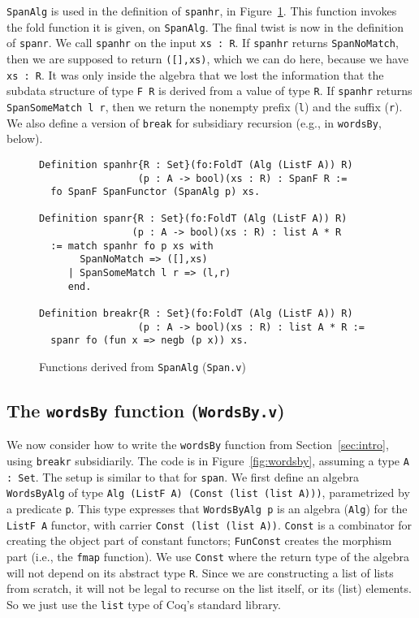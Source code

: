 \documentclass[a4paper,USenglish]{lipics-v2021}
\begin{document}
\verb|SpanAlg| is used in the definition of \verb|spanhr|, in
Figure~\ref{fig:span}.  This function invokes the fold function it is
given, on \verb|SpanAlg|.  The final twist is now in the definition of
\verb|spanr|.  We call \verb|spanhr| on the input \verb|xs : R|.  If
\verb|spanhr| returns \verb|SpanNoMatch|, then we are supposed to
return \verb|([],xs)|, which we can do here, because we have
\verb|xs : R|.  It was only inside the algebra that we lost the
information that the subdata structure of type \verb|F R| is derived
from a value of type \verb|R|.  If \verb|spanhr| returns
\verb|SpanSomeMatch l r|, then we return the nonempty
prefix (\verb|l|) and the suffix (\verb|r|).  We also define a version of \verb|break| 
for subsidiary recursion (e.g., in \verb|wordsBy|, below).


\begin{figure}
\begin{verbatim}
Definition spanhr{R : Set}(fo:FoldT (Alg (ListF A)) R)
                 (p : A -> bool)(xs : R) : SpanF R :=
  fo SpanF SpanFunctor (SpanAlg p) xs.

Definition spanr{R : Set}(fo:FoldT (Alg (ListF A)) R)
                (p : A -> bool)(xs : R) : list A * R
  := match spanhr fo p xs with
       SpanNoMatch => ([],xs)
     | SpanSomeMatch l r => (l,r)
     end.

Definition breakr{R : Set}(fo:FoldT (Alg (ListF A)) R)
                 (p : A -> bool)(xs : R) : list A * R :=
  spanr fo (fun x => negb (p x)) xs.
\end{verbatim}
\caption{Functions derived from \texttt{SpanAlg} (\texttt{Span.v})}
\label{fig:span}
\end{figure}


\subsection{The \texttt{wordsBy} function (\texttt{WordsBy.v})}

We now consider how to write the \verb|wordsBy| function from
Section~\ref{sec:intro}, using \verb|breakr| subsidiarily.  The code
is in Figure~\ref{fig:wordsby}, assuming a type \verb|A : Set|.  The
setup is similar to that for \verb|span|.  We first define an algebra
\verb|WordsByAlg| of type
\verb|Alg (ListF A) (Const (list (list A)))|, parametrized
by a predicate \verb|p|.  This type expresses that
\verb|WordsByAlg p| is an algebra (\verb|Alg|) for the \verb|ListF A|
functor, with carrier \verb|Const (list (list A))|.  \verb|Const| is
a combinator for creating the object part of constant functors;
\verb|FunConst| creates the morphism part (i.e., the \verb|fmap|
function).  We use \verb|Const| where the return type of the algebra
will not depend on its abstract type \verb|R|.  Since we are
constructing a list of lists from scratch, it will not be legal to
recurse on the list itself, or its (list) elements.  So we just use
the \verb|list| type of Coq's standard library.
\end{document}
